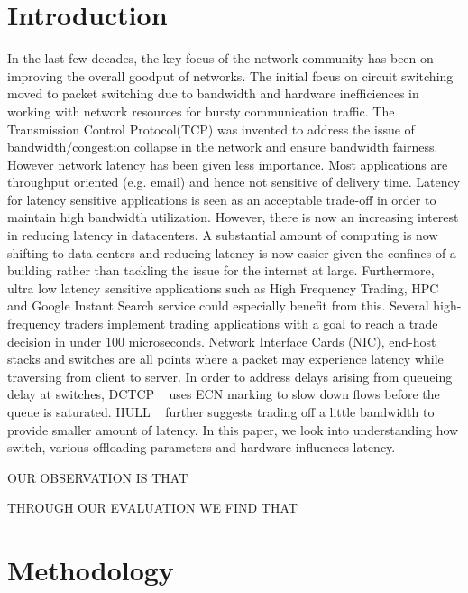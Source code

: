 \documentclass[letterpaper,twocolumn,10pt]{article}
\begin{document}
\section{Introduction} 
In the last few decades, the key focus of the network
community has been on improving the overall goodput of networks. The initial
focus on circuit switching moved to packet switching due to bandwidth and
hardware inefficiences in working with network resources for
bursty communication traffic. The Transmission Control Protocol(TCP) was
invented to address the issue of bandwidth/congestion collapse in the network
and ensure bandwidth fairness.~\cite{DCTCP,Queueing,TCP_Pacing} However network
latency has been given less importance. Most applications are throughput
oriented (e.g. email) and hence not sensitive of delivery time. Latency for
latency sensitive applications is seen as an acceptable trade-off in order to
maintain high bandwidth utilization.   
However, there is now an increasing interest in reducing latency in
datacenters. A substantial amount of computing is now shifting to data centers
and reducing latency is now easier given the confines of a building rather than
tackling the issue for the internet at large. Furthermore, ultra low latency
 sensitive applications such as High Frequency Trading, HPC and Google Instant 
Search service could especially benefit from this.
Several high-frequency traders implement trading applications with a goal to reach a
trade decision in under 100 microseconds. 
Network Interface Cards (NIC), end-host stacks and switches are all points 
where a packet may experience latency while traversing from client to server. 
In order to address delays arising from queueing delay at switches, 
DCTCP ~\cite{DCTCP} uses ECN marking to slow down flows before the queue is 
saturated. HULL ~\cite{HULL} further suggests trading off a little bandwidth to 
provide smaller amount of latency.  
In this paper, we look into understanding how switch, various offloading
parameters and hardware influences latency.

OUR OBSERVATION IS THAT

THROUGH OUR EVALUATION WE FIND THAT

\section{Methodology}
\end{document}

